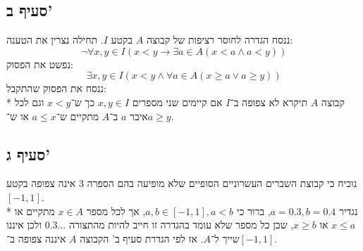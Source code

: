 \documentclass[a4paper]{article}
\begin{document}
\subsection{סעיף ב'}
ננסח הגדרה לחוסר רציפות של קבוצה $A$ בקטע $I$.
תחילה נצרין את הטענה:
\[
	\lnot \forall x, y \in I
	(x < y \rightarrow \exists a \in A (x < a \land a < y)) 
\]
נפשט את הפסוק:
\[
	\exists x, y \in I
	(x < y \land \forall a \in A (x \ge a \lor a \ge y))
\]
ננסח את הפסוק שהתקבל: \\*
קבוצה $A$ תיקרא לא צפופה ב־$I$ אם קיימים שני מספרים $x, y \in I$
כך ש־$x < y$ וגם לכל איבר $a$ ב־$A$ מתקיים ש־$a \le x$ או ש־$a \ge y$.

\subsection{סעיף ג'}
נוכיח כי קבוצת השברים העשרוניים הסופיים שלא מופיעה בהם הספרה 3 אינה צפופה בקטע $[-1, 1]$. \\*
נגדיר $a = 0.3, b = 0.4$, ברור כי $a, b \in [-1, 1], a < b$, אך לכל מספר $x \in A$ מתקיים או $x \le a$ או $x \ge b$,
שכן כל מספר שלא עומד בהגדרה זו חייב להיות מהתצורה $0.3\ldots$ ולכן איננו שייך ל־$A$.
אז לפי הגדרת סעיף ב' הקבוצה $A$ איננה צפופה ב־$[-1, 1]$.
\end{document}
